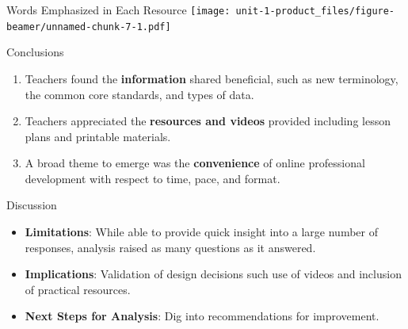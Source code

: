 \documentclass[
  ignorenonframetext,
]{beamer}
\providecommand{\tightlist}{%
  \setlength{\itemsep}{0pt}\setlength{\parskip}{0pt}}
\begin{document}
\begin{frame}{Words Emphasized in Each Resource}
\protect\hypertarget{words-emphasized-in-each-resource}{}
\texttt{[image: unit-1-product\_files/figure-beamer/unnamed-chunk-7-1.pdf]}
\end{frame}

\begin{frame}{Conclusions}
\protect\hypertarget{conclusions}{}
\begin{enumerate}
\tightlist
\item
  Teachers found the \textbf{information} shared beneficial, such as new
  terminology, the common core standards, and types of data.
\item
  Teachers appreciated the \textbf{resources and videos} provided
  including lesson plans and printable materials.
\item
  A broad theme to emerge was the \textbf{convenience} of online
  professional development with respect to time, pace, and format.
\end{enumerate}
\end{frame}

\begin{frame}{Discussion}
\protect\hypertarget{discussion}{}
\begin{itemize}
\tightlist
\item
  \textbf{Limitations}: While able to provide quick insight into a large
  number of responses, analysis raised as many questions as it
  answered.\\
\item
  \textbf{Implications}: Validation of design decisions such use of
  videos and inclusion of practical resources.\\
\item
  \textbf{Next Steps for Analysis}: Dig into recommendations for
  improvement.
\end{itemize}
\end{frame}
\end{document}
